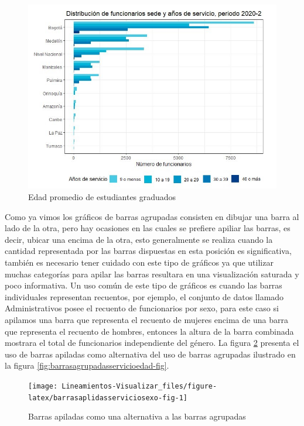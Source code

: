 \documentclass[
]{book}
\begin{document}
\begin{figure}

{\centering \includegraphics[width=1\linewidth]{Imágenes/añosedeadministrativos} 

}

\caption{Edad promedio de estudiantes graduados}\label{fig:barrasagrupadassedeservicio-fig}
\end{figure}

Como ya vimos los gráficos de barras agrupadas consisten en dibujar una barra al lado de la otra, pero hay ocasiones en las cuales se prefiere apiliar las barras, es decir, ubicar una encima de la otra, esto generalmente se realiza cuando la cantidad representada por las barras dispuestas en esta posición es significativa, también es necesario tener cuidado con este tipo de gráficos ya que utilizar muchas categorías para apilar las barras resultara en una visualización saturada y poco informativa. Un uso común de este tipo de gráficos es cuando las barras individuales representan recuentos, por ejemplo, el conjunto de datos llamado Administrativos posee el recuento de funcionarios por sexo, para este caso si apilamos una barra que representa el recuento de mujeres encima de una barra que representa el recuento de hombres, entonces la altura de la barra combinada mostrara el total de funcionarios independiente del género. La figura \ref{fig:barrasaplidasserviciosexo-fig} presenta el uso de barras apiladas como alternativa del uso de barras agrupadas ilustrado en la figura \ref{fig:barrasagrupadasservicioedad-fig}.

\begin{figure}

{\centering \texttt{[image: Lineamientos-Visualizar\_files/figure-latex/barrasaplidasserviciosexo-fig-1]} 

}

\caption{Barras apiladas como una alternativa a las barras agrupadas}\label{fig:barrasaplidasserviciosexo-fig}
\end{figure}
\end{document}
